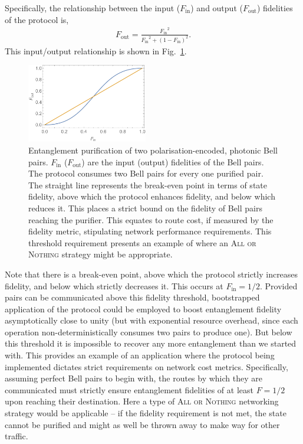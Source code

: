 Specifically, the relationship between the input ($F_\mathrm{in}$) and output ($F_\mathrm{out}$) fidelities of the protocol is,
\begin{align}
F_\mathrm{out} = \frac{{F_\mathrm{in}}^2}{{F_\mathrm{in}}^2 + (1-F_\mathrm{in})^2}.
\end{align}
This input/output relationship is shown in Fig.~\ref{fig:ent_purif}.

\begin{figure}[htpb]
\includegraphics[width=0.47\textwidth]{ent_purif}
\caption{Entanglement purification of two polarisation-encoded, photonic Bell pairs. $F_\mathrm{in}$ ($F_\mathrm{out}$) are the input (output) fidelities of the Bell pairs. The protocol consumes two Bell pairs for every one purified pair. The straight line represents the break-even point in terms of state fidelity, above which the protocol enhances fidelity, and below which reduces it. This places a strict bound on the fidelity of Bell pairs reaching the purifier. This equates to route cost, if measured by the fidelity metric, stipulating network performance requirements. This threshold requirement presents an example of where an \textsc{All or Nothing} strategy might be appropriate.} \label{fig:ent_purif}
\end{figure}

Note that there is a break-even point, above which the protocol strictly increases fidelity, and below which strictly decreases it. This occurs at \mbox{$F_\mathrm{in}=1/2$}. Provided pairs can be communicated above this fidelity threshold, bootstrapped application of the protocol could be employed to boost entanglement fidelity asymptotically close to unity (but with exponential resource overhead, since each operation non-deterministically consumes two pairs to produce one). But below this threshold it is impossible to recover any more entanglement than we started with. This provides an example of an application where the protocol being implemented dictates strict requirements on network cost metrics. Specifically, assuming perfect Bell pairs to begin with, the routes by which they are communicated must strictly ensure entanglement fidelities of at least \mbox{$F=1/2$} upon reaching their destination. Here a type of \textsc{All or Nothing} networking strategy would be applicable -- if the fidelity requirement is not met, the state cannot be purified and might as well be thrown away to make way for other traffic.

